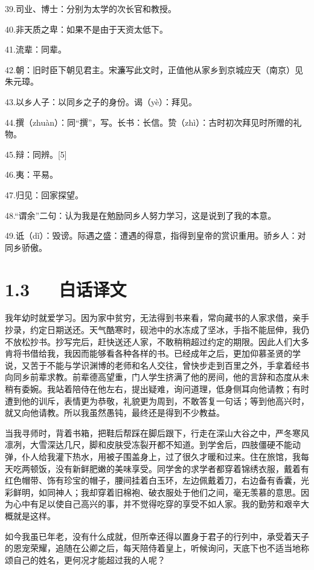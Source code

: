 \documentclass[letterpaper,12pt,english]{sphinxmanual}
\begin{document}
39.司业、博士：分别为太学的次长官和教授。

40.非天质之卑：如果不是由于天资太低下。

41.流辈：同辈。

42.朝：旧时臣下朝见君主。宋濂写此文时，正值他从家乡到京城应天（南京）见朱元璋。

43.以乡人子：以同乡之子的身份。谒（yè）：拜见。

44.撰（zhuàn）：同“撰”，写。长书：长信。贽（zhì）：古时初次拜见时所赠的礼物。

45.辩：同辨。{[}5{]}

46.夷：平易。

47.归见：回家探望。

48.“谓余”二句：认为我是在勉励同乡人努力学习，这是说到了我的本意。

49.诋（dǐ）：毁谤。际遇之盛：遭遇的得意，指得到皇帝的赏识重用。骄乡人：对同乡骄傲。


\section{1.3   白话译文}
\label{\detokenize{p01_u6563_u6587/_u5b8b_u6fc2-_u9001_u4e1c_u9633_u9a6c_u751f_u5e8f:id5}}
我年幼时就爱学习。因为家中贫穷，无法得到书来看，常向藏书的人家求借，亲手抄录，约定日期送还。天气酷寒时，砚池中的水冻成了坚冰，手指不能屈伸，我仍不放松抄书。抄写完后，赶快送还人家，不敢稍稍超过约定的期限。因此人们大多肯将书借给我，我因而能够看各种各样的书。已经成年之后，更加仰慕圣贤的学说，又苦于不能与学识渊博的老师和名人交往，曾快步走到百里之外，手拿着经书向同乡前辈求教。前辈德高望重，门人学生挤满了他的房间，他的言辞和态度从未稍有委婉。我站着陪侍在他左右，提出疑难，询问道理，低身侧耳向他请教；有时遭到他的训斥，表情更为恭敬，礼貌更为周到，不敢答复一句话；等到他高兴时，就又向他请教。所以我虽然愚钝，最终还是得到不少教益。

当我寻师时，背着书箱，把鞋后帮踩在脚后跟下，行走在深山大谷之中，严冬寒风凛冽，大雪深达几尺，脚和皮肤受冻裂开都不知道。到学舍后，四肢僵硬不能动弹，仆人给我灌下热水，用被子围盖身上，过了很久才暖和过来。住在旅馆，我每天吃两顿饭，没有新鲜肥嫩的美味享受。同学舍的求学者都穿着锦绣衣服，戴着有红色帽带、饰有珍宝的帽子，腰间挂着白玉环，左边佩戴着刀，右边备有香囊，光彩鲜明，如同神人；我却穿着旧棉袍、破衣服处于他们之间，毫无羡慕的意思。因为心中有足以使自己高兴的事，并不觉得吃穿的享受不如人家。我的勤劳和艰辛大概就是这样。

如今我虽已年老，没有什么成就，但所幸还得以置身于君子的行列中，承受着天子的恩宠荣耀，追随在公卿之后，每天陪侍着皇上，听候询问，天底下也不适当地称颂自己的姓名，更何况才能超过我的人呢？
\end{document}
